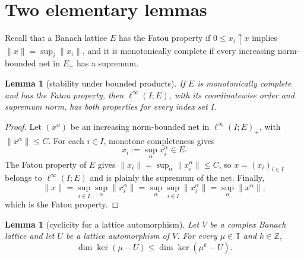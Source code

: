 \documentclass[11pt]{article}
\newtheorem{lemma}[theorem]{Lemma}
\newcommand{\Torus}{\mathbb T}
\begin{document}
\section*{Two elementary lemmas}

Recall that a Banach lattice \(E\) has the Fatou property if
\(0\leq x_i\uparrow x\) implies
\(\|x\|=\sup_i\|x_i\|\), and it is monotonically complete if every increasing
norm-bounded net in \(E_+\) has a supremum.

\begin{lemma}[stability under bounded products]\label{lem:product}
If \(E\) is monotonically complete and has the Fatou property, then
\(\ell^\infty(I;E)\), with its coordinatewise order and supremum norm, has
both properties for every index set \(I\).
\end{lemma}

\begin{proof}
Let \((x^\alpha)\) be an increasing norm-bounded net in
\(\ell^\infty(I;E)_+\), with \(\|x^\alpha\|\leq C\).  For each \(i\in I\),
monotone completeness gives
\[
 x_i:=\sup_\alpha x_i^\alpha\in E.
\]
The Fatou property of \(E\) gives
\(\|x_i\|=\sup_\alpha\|x_i^\alpha\|\leq C\), so
\(x=(x_i)_{i\in I}\) belongs to \(\ell^\infty(I;E)\) and is plainly the
supremum of the net.  Finally,
\[
 \|x\|
 =\sup_{i\in I}\sup_\alpha\|x_i^\alpha\|
 =\sup_\alpha\sup_{i\in I}\|x_i^\alpha\|
 =\sup_\alpha\|x^\alpha\|,
\]
which is the Fatou property.
\end{proof}

\begin{lemma}[cyclicity for a lattice automorphism]\label{lem:lattice-auto}
Let \(V\) be a complex Banach lattice and let \(U\) be a lattice
automorphism of \(V\).  For every \(\mu\in\Torus\) and \(k\in\mathbb Z\),
\[
 \dim\ker(\mu-U)\leq\dim\ker(\mu^k-U).
\]
\end{lemma}
\end{document}
